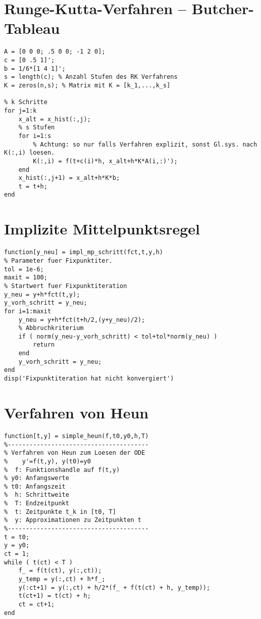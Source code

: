 \section{Runge-Kutta-Verfahren -- Butcher-Tableau} 
	\begin{lstlisting}[style=list]
A = [0 0 0; .5 0 0; -1 2 0];
c = [0 .5 1]';
b = 1/6*[1 4 1]';
s = length(c); % Anzahl Stufen des RK Verfahrens
K = zeros(n,s); % Matrix mit K = [k_1,...,k_s]

% k Schritte
for j=1:k
	x_alt = x_hist(:,j);
	% s Stufen
	for i=1:s
		% Achtung: so nur falls Verfahren explizit, sonst Gl.sys. nach K(:,i) loesen.
		K(:,i) = f(t+c(i)*h, x_alt+h*K*A(i,:)');
	end
	x_hist(:,j+1) = x_alt+h*K*b;
	t = t+h;
end
	\end{lstlisting}

\section{Implizite Mittelpunktsregel}
	\begin{lstlisting}[style=list]
function[y_neu] = impl_mp_schritt(fct,t,y,h)
% Parameter fuer Fixpunktiter.
tol = 1e-6;
maxit = 100;
% Startwert fuer Fixpunktiteration
y_neu = y+h*fct(t,y);
y_vorh_schritt = y_neu;
for i=1:maxit
	y_neu = y+h*fct(t+h/2,(y+y_neu)/2);
	% Abbruchkriterium
	if ( norm(y_neu-y_vorh_schritt) < tol+tol*norm(y_neu) )
		return
	end
	y_vorh_schritt = y_neu;
end
disp('Fixpunktiteration hat nicht konvergiert')
	\end{lstlisting}

\section{Verfahren von Heun}
	\begin{lstlisting}[style=list]
function[t,y] = simple_heun(f,t0,y0,h,T)
%---------------------------------------
% Verfahren von Heun zum Loesen der ODE
%    y'=f(t,y), y(t0)=y0
%  f: Funktionshandle auf f(t,y)
% y0: Anfangswerte
% t0: Anfangszeit
%  h: Schrittweite
%  T: Endzeitpunkt
%  t: Zeitpunkte t_k in [t0, T]
%  y: Approximationen zu Zeitpunkten t
%---------------------------------------
t = t0;
y = y0;
ct = 1;
while ( t(ct) < T )
	f_ = f(t(ct), y(:,ct));
	y_temp = y(:,ct) + h*f_;
	y(:ct+1) = y(:,ct) + h/2*(f_ + f(t(ct) + h, y_temp));
	t(ct+1) = t(ct) + h;
	ct = ct+1;
end
	\end{lstlisting}
